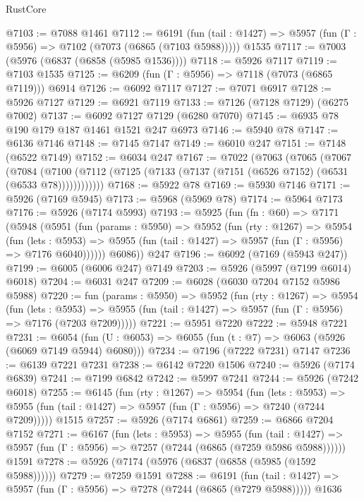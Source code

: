 \begin{lexlean}{RustCore}
\begin{coremodule}
@7103 := @7088 @1461
@7112 := @6191
    (fun (tail : @1427) => @5957 (fun (Γ : @5956) => @7102 (@7073 (@6865 (@7103 @5988)))))
    @1535
@7117 := @7003 (@5976 (@6837 (@6858 (@5985 @1536))))
@7118 := @5926 @7117
@7119 := @7103 @1535
@7125 := @6209 (fun (Γ : @5956) => @7118 (@7073 (@6865 @7119))) @6914
@7126 := @6092 @7117
@7127 := @7071 @6917
@7128 := @5926 @7127
@7129 := @6921 @7119
@7133 := @7126 (@7128 @7129) (@6275 @7002)
@7137 := @6092 @7127 @7129 (@6280 @7070)
@7145 := @6935 @78 @190 @179 @187 @1461 @1521 @247 @6973
@7146 := @5940 @78
@7147 := @6136 @7146
@7148 := @7145 @7147
@7149 := @6010 @247
@7151 := @7148 (@6522 @7149)
@7152 := @6034 @247
@7167 := @7022
    (@7063
      (@7065
        (@7067
          (@7084
            (@7100 (@7112 (@7125 (@7133 (@7137 (@7151 (@6526 @7152) (@6531 (@6533 @78))))))))))))
@7168 := @5922 @78
@7169 := @5930 @7146
@7171 := @5926 (@7169 @5945)
@7173 := @5968 (@5969 @78)
@7174 := @5964 @7173
@7176 := @5926 (@7174 @5993)
@7193 := @5925
    (fun (fn : @60) =>
    @7171
      (@5948
        (@5951
          (fun (params : @5950) =>
          @5952
            (fun (rty : @1267) =>
            @5954
              (fun (lets : @5953) =>
              @5955 (fun (tail : @1427) => @5957 (fun (Γ : @5956) => @7176 @6040))))))
        @6086))
    @247
@7196 := @6092 (@7169 (@5943 @247))
@7199 := @6005 (@6006 @247) @7149
@7203 := @5926 (@5997 (@7199 @6014) @6018)
@7204 := @6031 @247
@7209 := @6028 (@6030 @7204 @7152 @5986 @5988)
@7220 := fun (params : @5950) =>
  @5952
    (fun (rty : @1267) =>
    @5954
      (fun (lets : @5953) =>
      @5955 (fun (tail : @1427) => @5957 (fun (Γ : @5956) => @7176 (@7203 @7209)))))
@7221 := @5951 @7220
@7222 := @5948 @7221
@7231 := @6054 (fun (U : @6053) => @6055 (fun (t : @7) => @6063 (@5926 (@6069 @7149 @5944) @6080)))
@7234 := @7196 (@7222 @7231) @7147
@7236 := @6139 @7221 @7231
@7238 := @6142 @7220 @1506
@7240 := @5926 (@7174 @6839)
@7241 := @7199 @6842
@7242 := @5997 @7241
@7244 := @5926 (@7242 @6018)
@7255 := @6145
    (fun (rty : @1267) =>
    @5954
      (fun (lets : @5953) =>
      @5955 (fun (tail : @1427) => @5957 (fun (Γ : @5956) => @7240 (@7244 @7209)))))
    @1515
@7257 := @5926 (@7174 @6861)
@7259 := @6866 @7204 @7152
@7271 := @6167
    (fun (lets : @5953) =>
    @5955
      (fun (tail : @1427) => @5957 (fun (Γ : @5956) => @7257 (@7244 (@6865 (@7259 @5986 @5988))))))
    @1591
@7278 := @5926 (@7174 (@5976 (@6837 (@6858 (@5985 (@1592 @5988))))))
@7279 := @7259 @1591
@7288 := @6191
    (fun (tail : @1427) => @5957 (fun (Γ : @5956) => @7278 (@7244 (@6865 (@7279 @5988)))))
    @1636

\end{coremodule}
\end{lexlean}
